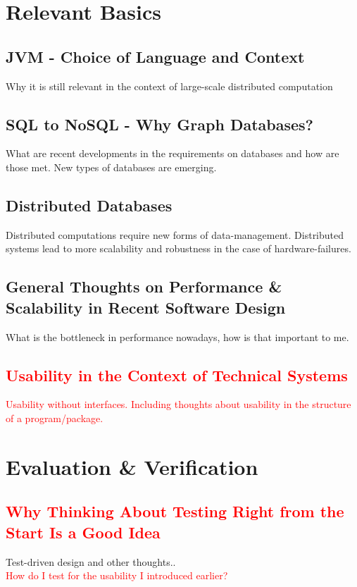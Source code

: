 \documentclass[11p]{scrartcl}
\begin{document}
\section{Relevant Basics}
\label{sec:basics}
\subsection{JVM - Choice of Language and Context}
Why it is still relevant in the context of large-scale distributed computation
\subsection{SQL to NoSQL - Why Graph Databases?}
What are recent developments in the requirements on databases and how are those met. New types of databases are emerging.
\subsection{Distributed Databases}
Distributed computations require new forms of data-management. Distributed systems lead to more scalability and robustness in the case of hardware-failures.
\subsection{General Thoughts on Performance \& Scalability in Recent Software Design}
What is the bottleneck in performance nowadays, how is that important to me.

\subsection{\textcolor{red}{Usability in the Context of Technical Systems}}
\textcolor{red}{Usability without interfaces. Including thoughts about usability in the structure of a program/package.}



\section{Evaluation \& Verification}
\label{sec:evaluation}
\subsection{\textcolor{red}{Why Thinking About Testing Right from the Start Is a Good Idea}}
Test-driven design and other thoughts..\\
\textcolor{red}{How do I test for the usability I introduced earlier?}
\end{document}
